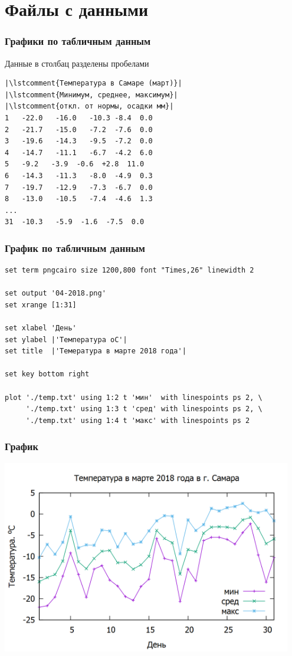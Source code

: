 \documentclass[12pt, compress]{beamer}
\newcommand{\lstcomment}[1]{\textcolor{dark-green}{\# \texttt{#1}}}
\begin{document}
\section{Файлы с данными}

\begin{frame}[c,fragile]
\frametitle{Графики по табличным данным}
Данные в столбац разделены пробелами
\begin{lstlisting}
|\lstcomment{Температура в Самаре (март)}|
|\lstcomment{Минимум, среднее, максимум}|
|\lstcomment{откл. от нормы, осадки мм}|
1   -22.0   -16.0   -10.3 -8.4  0.0
2   -21.7   -15.0   -7.2  -7.6  0.0
3   -19.6   -14.3   -9.5  -7.2  0.0
4   -14.7   -11.1   -6.7  -4.2  6.0
5   -9.2   -3.9  -0.6  +2.8  11.0
6   -14.3   -11.3   -8.0  -4.9  0.3
7   -19.7   -12.9   -7.3  -6.7  0.0
8   -13.0   -10.5   -7.4  -4.6  1.3
...
31  -10.3   -5.9  -1.6  -7.5  0.0
\end{lstlisting}
\end{frame}

\begin{frame}[t,fragile]
\frametitle{График по табличным данным}
\begin{lstlisting}[basicstyle={\scriptsize}]
set term pngcairo size 1200,800 font "Times,26" linewidth 2

set output '04-2018.png'
set xrange [1:31]

set xlabel 'День'
set ylabel |'Температура oС'|
set title  |'Темература в марте 2018 года'|

set key bottom right

plot './temp.txt' using 1:2 t 'мин'  with linespoints ps 2, \
     './temp.txt' using 1:3 t 'сред' with linespoints ps 2, \
     './temp.txt' using 1:4 t 'макс' with linespoints ps 2
\end{lstlisting}  
\end{frame}

\begin{frame}[t]
\frametitle{График}
\includegraphics[width=0.95\textwidth]{./gp/04-2018.png}
\end{frame}
\end{document}
